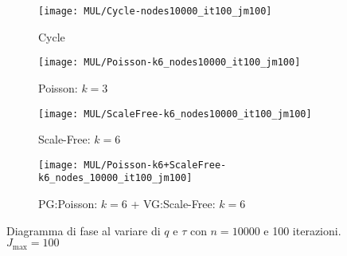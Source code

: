     \begin{figure}[H]
        \begin{minipage}{\linewidth}
            \centering
            \begin{minipage}{0.45\linewidth}
                \begin{figure}
                    \texttt{[image: MUL/Cycle-nodes10000\_it100\_jm100]}\caption{Cycle}
                    \label{fig:mul_cycle_nodes_10000_jm_100}
                \end{figure}
            \end{minipage}
            \hspace{0.05\linewidth}
            \begin{minipage}{0.45\linewidth}
                \begin{figure}
                    \texttt{[image: MUL/Poisson-k6\_nodes10000\_it100\_jm100]}\caption{Poisson: $k=3$}
                    \label{fig:mul_poisson_k_3_nodes_10000_jm_100}
                \end{figure}
            \end{minipage}
            \hspace{0.05\linewidth}
            \begin{minipage}{0.45\linewidth}
                \begin{figure}
                    \texttt{[image: MUL/ScaleFree-k6\_nodes10000\_it100\_jm100]}\caption{Scale-Free: $k=6$}
                    \label{fig:mul_scale_free_k_6_nodes_10000_jm_100}
                \end{figure}
            \end{minipage}
            \begin{minipage}{0.45\linewidth}
                \begin{figure}
                    \texttt{[image: MUL/Poisson-k6+ScaleFree-k6\_nodes\_10000\_it100\_jm100]}\caption{PG:Poisson: $k=6$ + VG:Scale-Free: $k=6$}
                    \label{fig:mul_poisson_k_6_scale_free_k_6_nodes_10000_jm_100}
                \end{figure}
            \end{minipage}
            \caption{Diagramma di fase al variare di $q$ e $\tau$ con $n=10000$ e 100 iterazioni. $J_{\max}=100$}
        \end{minipage}
    \end{figure}
